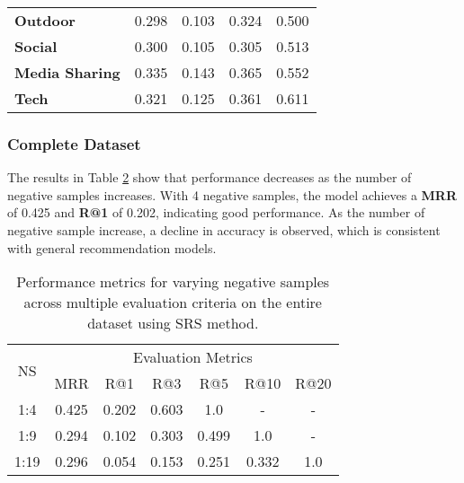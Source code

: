 \begin{table}[h]
\begin{tabular}{lllll}
    \textbf{Outdoor} 
    & 0.298 & 0.103 & 0.324 & 0.500 \\
     
     \textbf{Social}
    & 0.300 & 0.105 & 0.305 & 0.513 \\
    
    \textbf{Media Sharing} 
    &  0.335 & 0.143 & 0.365 & 0.552 \\
    \textbf{Tech} 
    & 0.321 & 0.125 & 0.361 & 0.611  \\
   
    \bottomrule
    \end{tabular}
    \label{tab:domain-negative-samples}
\end{table}


\subsubsection{Complete Dataset}
The results in Table \ref{tab:srs-full} show that performance decreases as the number of negative samples increases. With 4 negative samples, the model achieves a \textbf{MRR} of 0.425 and \textbf{R@1} of 0.202, indicating good performance. As the number of negative sample increase, a decline in accuracy is observed, which is consistent with general recommendation models. 

\begin{table}[h!]
\centering
\caption{Performance metrics for varying negative samples across multiple evaluation criteria on the entire dataset using SRS method.}
\begin{tabular}{ccccccc}
\hline
\multirow{2}{*}{{NS}} & \multicolumn{6}{c}{Evaluation Metrics} \\
\cline{2-7}
& MRR  & R@1  & R@3  & R@5  & R@10 & R@20 \\
\hline
1:4  & 0.425 & 0.202 & 0.603 & 1.0  & -    & - \\
1:9  & 0.294 & 0.102 & 0.303 & 0.499 & 1.0  & - \\
1:19 & 0.296 & 0.054 & 0.153 & 0.251 & 0.332 & 1.0 \\
\hline
\end{tabular}
\label{tab:srs-full}
\end{table}

